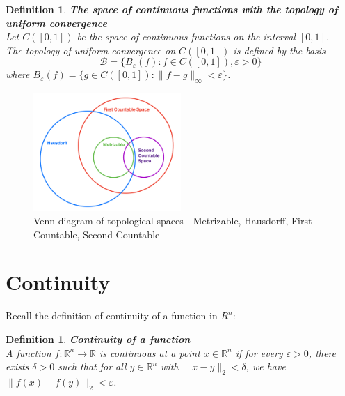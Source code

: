 \documentclass[11pt]{book} %
\newtheorem{definition}{Definition}[section]
\newtheorem*{definition*}{Definition}
\begin{document}
\begin{definition}{\textbf{The space of continuous functions with the topology of uniform convergence}} \\
    Let \( C([0, 1]) \) be the space of continuous functions on the interval \( [0, 1] \). \\
    The topology of uniform convergence on \( C([0, 1]) \) is defined by the basis
    \begin{equation*}
        \mathcal{B} = \{ B_{\varepsilon}(f) : f \in C([0, 1]), \varepsilon > 0 \}
    \end{equation*}
    where \( B_{\varepsilon}(f) = \{ g \in C([0, 1]) : \| f - g \|_{\infty} < \varepsilon \} \).
\end{definition}

\begin{figure}[H]
    \centering
    \includegraphics[width=0.5\textwidth]{Figs/topological_spaces_diagram.jpeg}
    \caption{Venn diagram of topological spaces - Metrizable, Hausdorff, First Countable, Second Countable}
\end{figure}



\section{Continuity}

Recall the definition of continuity of a function in $R^n$:
\begin{definition*}{\textbf{Continuity of a function}} \\
    A function \( f: \mathbb{R}^n \to \mathbb{R} \) is continuous at a point \( x \in \mathbb{R}^n \) 
    if for every \( \varepsilon > 0 \), there exists \( \delta > 0 \) such that for all \( y \in \mathbb{R}^n \) with
     \( \| x - y \|_2 < \delta \), we have \( \| f(x) - f(y) \|_2 < \varepsilon \).
\end{definition*}
\end{document}
